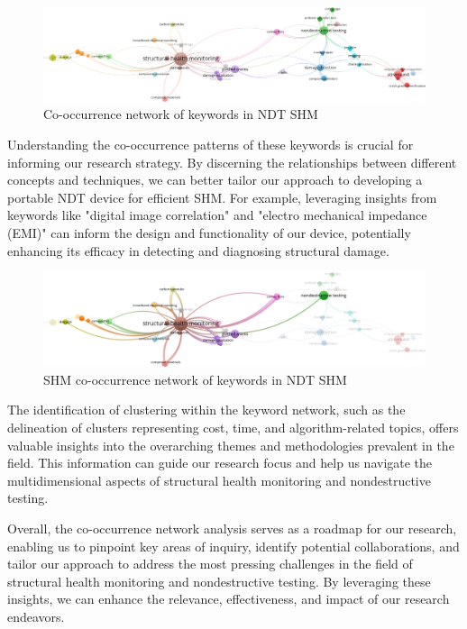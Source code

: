 \documentclass[journal, a4paper]{IEEEtran}
\begin{document}
\begin{figure}[h] %
  \centering
  \includegraphics[width=\textwidth]{./word_cloud/filtered/co_occurance_network.jpg}
  \caption{Co-occurrence network of keywords in NDT SHM}
  \label{fig:coOccuranceNetwork}
\end{figure}

Understanding the co-occurrence patterns of these keywords is crucial for informing our research strategy.
By discerning the relationships between different concepts and techniques, we can better tailor our approach
to developing a portable NDT device for efficient SHM.
For example, leveraging insights from keywords like "digital image correlation" and "electro mechanical impedance (EMI)"
can inform the design and functionality of our device, potentially enhancing its efficacy in detecting and diagnosing
structural damage.


\begin{figure}[h] %
  \centering
  \includegraphics[width=\textwidth]{./word_cloud/filtered/co_occurance_network_shm.jpg}
  \caption{SHM co-occurrence network of keywords in NDT SHM}
  \label{fig:coOccuranceNetworkSHM}
\end{figure}

The identification of clustering within the keyword network, such as the delineation of clusters representing cost,
time, and algorithm-related topics, offers valuable insights into the overarching themes and
methodologies prevalent in the field. This information can guide our research focus and help us navigate
the multidimensional aspects of structural health monitoring and nondestructive testing.

Overall, the co-occurrence network analysis serves as a roadmap for our research,
enabling us to pinpoint key areas of inquiry, identify potential collaborations,
and tailor our approach to address the most pressing challenges in the field of structural
health monitoring and nondestructive testing. By leveraging these insights, we can enhance the relevance,
effectiveness, and impact of our research endeavors.
\end{document}

